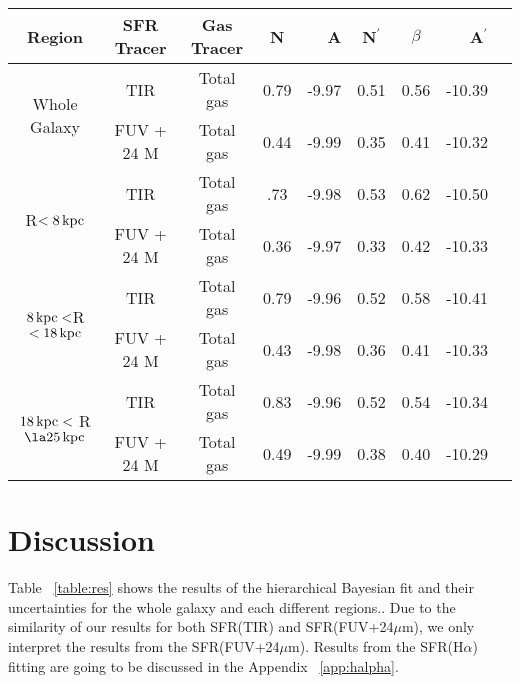 \documentclass[useAMS,usenatbib]{mn2e}
\newcommand \kpc        {\,{\rm kpc}}
\newcommand \nprime {N$^\prime$}
\begin{document}
\begin{table*}
\caption{Fitting parameters of the SF laws from applying the Bayesian method Face on}
\label{table:res}
\begin{tabular}{ccccrccrr}
\hline\hline
\multicolumn{1}{c}{\multirow{1}{*}{Region}} & SFR Tracer        & Gas Tracer & N    & A      & \nprime & $\beta$ & A$^\prime$ \\
\hline
\multicolumn{1}{c}{\multirow{2}{*}{Whole Galaxy}}
 & TIR               & Total gas & 0.79 & -9.97  &  0.51   & 0.56   & -10.39   \\
 & FUV + 24 M       & Total gas  & 0.44 & -9.99 & 0.35    & 0.41    & -10.32     \\
\hline
\multicolumn{1}{c}{\multirow{2}{*}{R$< 8\kpc$}}
 & TIR               & Total gas    & .73 & -9.98 & 0.53    & 0.62    & -10.50     \\
 & FUV + 24 M       & Total gas  & 0.36 & -9.97 & 0.33    & 0.42    & -10.33      \\
\hline
\multicolumn{1}{c}{\multirow{2}{*}{$8\kpc < $R $< 18\kpc$}}
 & TIR               & Total gas    & 0.79 & -9.96  & 0.52    & 0.58    & -10.41     \\
 & FUV + 24 M       & Total gas  & 0.43 & -9.98 & 0.36    & 0.41    & -10.33     \\
\hline
\multicolumn{1}{c}{\multirow{2}{*}{$18\kpc <$ R $\la 25\kpc$}} 
 & TIR              & Total gas   & 0.83 & -9.96  & 0.52    & 0.54    & -10.34     \\
 & FUV + 24 M       & Total gas  & 0.49 & -9.99 & 0.38    & 0.40    & -10.29     \\
 \hline
\end{tabular}
\end{table*}
%
\section{Discussion}

Table ~\ref{table:res} shows the results of the hierarchical Bayesian fit and their uncertainties for the whole galaxy and each different regions.. Due to the similarity of our results for both SFR(TIR) and SFR(FUV+24$\mu$m), we only interpret the results from the SFR(FUV+24$\mu$m). Results from the SFR(H$\alpha$) fitting are going to be discussed in the Appendix ~\ref{app:halpha}.
\end{document}
